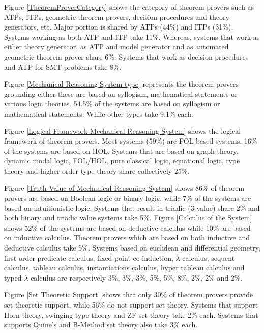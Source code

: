 Figure \ref{TheoremProverCategory} shows the category of theorem provers such as ATPs, ITPs, geometric theorem provers, decision procedures
and theory generators, etc. Major portion is shared by ATPs (44\%) and ITPs (31\%). Systems working as both ATP and ITP take 11\%. 
Whereas, systems that work as either theory generator, as ATP and model generator and as automated geometric theorem prover
share 6\%. Systems that work as decision procedures and ATP for SMT problems take 8\%.

Figure \ref{Mechanical Reasoning System type} represents the theorem provers grounding either these are based on syllogism, mathematical 
statements or various logic theories. 54.5\% of the systems are based on syllogism or mathematical statements. While other types take 9.1\%  
each.

Figure \ref{Logical Framework Mechanical Reasoning System} shows the logical framework of theorem provers. Most systems (59\%) are FOL 
based systems. 16\% of the systems are based on HOL. Systems that are 
based on graph theory, dynamic modal logic, FOL/HOL, pure classical logic, equational logic, type theory and higher order type theory 
share collectively 25\%.

Figure \ref{Truth Value of Mechanical Reasoning System} shows 86\% of theorem provers are based on Boolean logic or binary logic, while 7\% of the 
systems are based on intuitionistic logic. Systems that result in triadic (3-value) share 2\% and both binary and 
triadic value systems take 5\%.
Figure \ref{Calculus of the System} shows 52\% of the systems are based on deductive calculus while 10\% are based on inductive calculus. 
Theorem provers which are based on both inductive and deductive calculus take 5\%. Systems based on euclidean and differential geometry, 
first order predicate calculus, fixed point co-induction, $\lambda$-calculus, sequent calculus, tableau calculus, instantiations calculus, 
hyper tableau calculus and typed $\lambda$-calculus are respectively 3\%, 3\%, 3\%, 5\%, 5\%, 8\%, 2\%, 2\% and 2\%.

Figure \ref{Set Theoretic Support} shows that only 30\% of theorem provers provide set theoretic support, while 56\% do
not support set theory. Systems that support  Horn theory, swinging type theory and ZF set theory take 2\% each. Systems that 
supports Quine's and B-Method set theory also take 3\% each.

